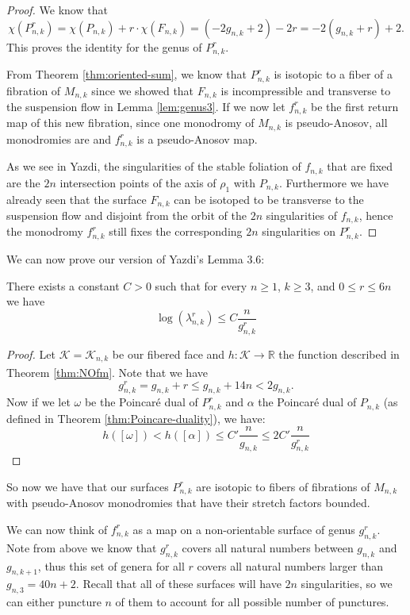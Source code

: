 \begin{proof}
    We know that
    $$\chi(P^r_{n,k}) = \chi(P_{n,k}) + r\cdot\chi(F_{n,k}) = (-2g_{n,k} + 2)-2r = -2(g_{n,k} + r) + 2.$$ This proves the identity for the genus of $P^r_{n,k}.$

    From Theorem \ref{thm:oriented-sum}, we know that $P^r_{n,k}$ is isotopic to a fiber of a fibration of $M_{n,k}$ since we showed that $F_{n,k}$ is incompressible and transverse to the suspension flow in Lemma \ref{lem:genus3}. If we now let $f^r_{n,k}$ be the first return map of this new fibration, since one monodromy of $M_{n,k}$ is pseudo-Anosov, all monodromies are and $f^r_{n,k}$ is a pseudo-Anosov map.

    As we see in Yazdi, the singularities of the stable foliation of $f_{n,k}$ that are fixed are the $2n$ intersection points of the axis of $\rho_1$ with $P_{n,k}$. Furthermore we have already seen that the surface $F_{n,k}$ can be isotoped to be transverse to the suspension flow and disjoint from the orbit of the $2n$ singularities of $f_{n,k}$, hence the monodromy $f^r_{n,k}$ still fixes the corresponding $2n$ singularities on $P^r_{n,k}$.
\end{proof}

We can now prove our version of Yazdi's Lemma 3.6:

\begin{lem}
\label{lem:bound}
There exists a constant $C > 0$ such that for every $n \geq 1$, $k \geq 3$, and $0 \leq r \leq 6n$ we have $$\log(\lambda^r_{n,k}) \leq C\frac{n}{g^r_{n,k}}$$
\end{lem}
\begin{proof}
    Let $\mathcal{K} = \mathcal{K}_{n,k}$ be our fibered face and $h: \mathcal{K} \xrightarrow[]{} \mathbb{R}$ the function described in Theorem \ref{thm:NOfm}. Note that we have
    $$g^r_{n,k} = g_{n,k} + r \leq g_{n,k} + 14n < 2g_{n,k}.$$
    Now if we let $\omega$ be the Poincar\'e dual of $P^r_{n,k}$ and $\alpha$ the Poincar\'e dual of $P_{n,k}$ (as defined in Theorem \ref{thm:Poincare-duality}), we have:
    $$h([\omega]) < h([\alpha]) \leq C'\frac{n}{g_{n,k}} \leq 2C'\frac{n}{g^r_{n,k}} $$
\end{proof}

So now we have that our surfaces $P^r_{n,k}$ are isotopic to fibers of fibrations of $M_{n,k}$ with pseudo-Anosov monodromies that have their stretch factors bounded.

We can now think of $f^r_{n,k}$ as a map on a non-orientable surface of genus $g^r_{n,k}$. Note from above we know that $g^r_{n,k}$ covers all natural numbers between $g_{n,k}$ and $g_{n,k+1}$, thus this set of genera for all $r$ covers all natural numbers larger than $g_{n,3} = 40n + 2$. Recall that all of these surfaces will have $2n$ singularities, so we can either puncture $n$ of them to account for all possible number of punctures.

